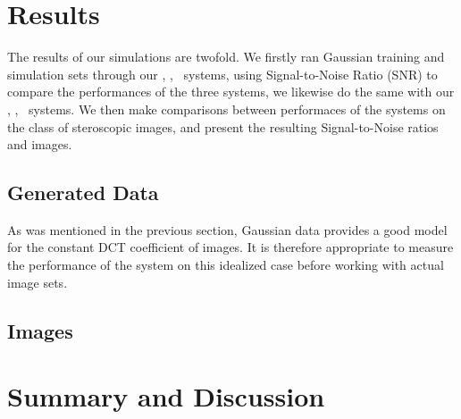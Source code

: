 \section{Results}
The results of our simulations are twofold. We firstly ran Gaussian training and simulation sets through our \sysII, \sysIJ, \sysJJ\ systems, using Signal-to-Noise Ratio (SNR) to compare the performances of the three systems, we likewise do the same with our \sysIIN, \sysIJN, \sysJJN\ systems. We then make comparisons between performaces of the systems on the class of steroscopic images, and present the resulting Signal-to-Noise ratios and images.
\subsection{Generated Data}
As was mentioned in the previous section, Gaussian data provides a good model for the constant DCT coefficient of images. It is therefore appropriate to measure the performance of the system on this idealized case before working with actual image sets.

\subsection{Images}

\section{Summary and Discussion}
